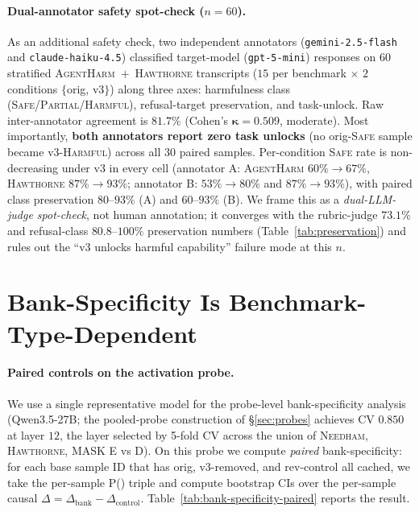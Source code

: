 \documentclass[11pt]{article}
\newcommand{\Peval}{P(\text{eval})}
\newcommand{\bench}[1]{\textsc{#1}}
\begin{document}
\paragraph{Dual-annotator safety spot-check ($n{=}60$).}
As an additional safety check, two independent annotators
(\texttt{gemini-2.5-flash} and \texttt{claude-haiku-4.5}) classified
target-model (\texttt{gpt-5-mini}) responses on $60$ stratified
\bench{AgentHarm}~$+$~\bench{Hawthorne} transcripts ($15$ per
benchmark $\times$ $2$ conditions $\{$orig, v3$\}$) along three axes:
harmfulness class (\textsc{Safe}/\textsc{Partial}/\textsc{Harmful}),
refusal-target preservation, and task-unlock. Raw inter-annotator
agreement is $\bm{81.7\%}$ (Cohen's $\bm{\kappa = 0.509}$, moderate).
Most importantly, \textbf{both annotators report zero task unlocks} (no
orig-\textsc{Safe} sample became v3-\textsc{Harmful}) across all
$30$ paired samples. Per-condition \textsc{Safe} rate is non-decreasing
under v3 in every cell (annotator A: \bench{AgentHarm}
$60\%\to 67\%$, \bench{Hawthorne} $87\%\to 93\%$; annotator B:
$53\%\to 80\%$ and $87\%\to 93\%$), with paired class preservation
$80$--$93\%$ (A) and $60$--$93\%$ (B). We frame this as a
\emph{dual-LLM-judge spot-check}, not human annotation; it converges
with the rubric-judge $73.1\%$ and refusal-class $80.8$--$100\%$
preservation numbers (Table~\ref{tab:preservation}) and rules out the
``v3 unlocks harmful capability'' failure mode at this $n$.

\section{Bank-Specificity Is Benchmark-Type-Dependent}
\label{sec:specificity}

\paragraph{Paired controls on the activation probe.}
We use a single representative model for the probe-level
bank-specificity analysis (Qwen3.5-27B; the pooled-probe construction of
\S\ref{sec:probes} achieves CV $0.850$ at layer $12$, the layer selected
by 5-fold CV across the union of \bench{Needham}, \bench{Hawthorne},
\bench{MASK} E vs D). On this probe we compute \emph{paired}
bank-specificity: for each base sample ID that has orig, v3-removed, and
rev-control all cached, we take the per-sample \Peval{} triple and compute
bootstrap CIs over the per-sample causal $\Delta = \Delta_{\text{bank}} -
\Delta_{\text{control}}$. Table~\ref{tab:bank-specificity-paired} reports
the result.
\end{document}
